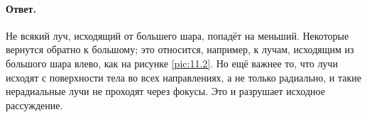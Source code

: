\paragraph{Ответ.} Не всякий луч, исходящий от большего шара, попадёт на меньший.
Некоторые вернутся обратно к большому;
это относится, например, к лучам, исходящим из большого шара влево, как на рисунке \ref{pic:11.2}.
Но ещё важнее то, что лучи исходят с поверхности тела во всех направлениях, а не только радиально, и такие нерадиальные лучи не проходят через фокусы.
Это и разрушает исходное рассуждение.
